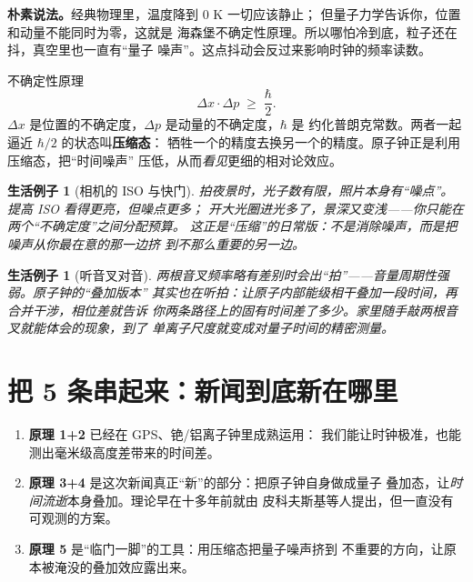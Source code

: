 \documentclass[11pt,a4paper]{ctexart}
\newtheorem{example}[principle]{生活例子}
\begin{document}
\begin{intuitionblock}
\textbf{朴素说法。}经典物理里，温度降到 $0$ K 一切应该静止；
但量子力学告诉你，位置和动量不能同时为零，这就是
海森堡不确定性原理。所以哪怕冷到底，粒子还在抖，真空里也一直有``量子
噪声''。这点抖动会反过来影响时钟的频率读数。
\end{intuitionblock}

\begin{mathblock}{不确定性原理}
\[
  \Delta x \cdot \Delta p \;\ge\; \frac{\hbar}{2}.
\]
$\Delta x$ 是位置的不确定度，$\Delta p$ 是动量的不确定度，$\hbar$ 是
约化普朗克常数。两者一起逼近 $\hbar/2$ 的状态叫\textbf{压缩态}：
牺牲一个的精度去换另一个的精度。原子钟正是利用压缩态，把``时间噪声''
压低，从而\emph{看见}更细的相对论效应。
\end{mathblock}

\begin{example}[相机的 ISO 与快门]
拍夜景时，光子数有限，照片本身有``噪点''。提高 ISO 看得更亮，但噪点更多；
开大光圈进光多了，景深又变浅——你只能在两个``不确定度''之间分配预算。
这正是``压缩''的日常版：不是消除噪声，而是把噪声从你最在意的那一边挤
到不那么重要的另一边。
\end{example}

\begin{example}[听音叉对音]
两根音叉频率略有差别时会出``拍''——音量周期性强弱。原子钟的``叠加版本''
其实也在听拍：让原子内部能级相干叠加一段时间，再合并干涉，相位差就告诉
你两条路径上的固有时间差了多少。家里随手敲两根音叉就能体会的现象，到了
单离子尺度就变成对量子时间的精密测量。
\end{example}

\section{把 5 条串起来：新闻到底新在哪里}

\begin{enumerate}[label=\textbf{\arabic*.}]
  \item \textbf{原理 1+2} 已经在 GPS、铯/铝离子钟里成熟运用：
        我们能让时钟极准，也能测出毫米级高度差带来的时间差。
  \item \textbf{原理 3+4} 是这次新闻真正``新''的部分：把原子钟自身做成量子
        叠加态，让\emph{时间流逝}本身叠加。理论早在十多年前就由
        皮科夫斯基等人提出，但一直没有可观测的方案。
  \item \textbf{原理 5} 是``临门一脚''的工具：用压缩态把量子噪声挤到
        不重要的方向，让原本被淹没的叠加效应露出来。
\end{enumerate}
\end{document}
